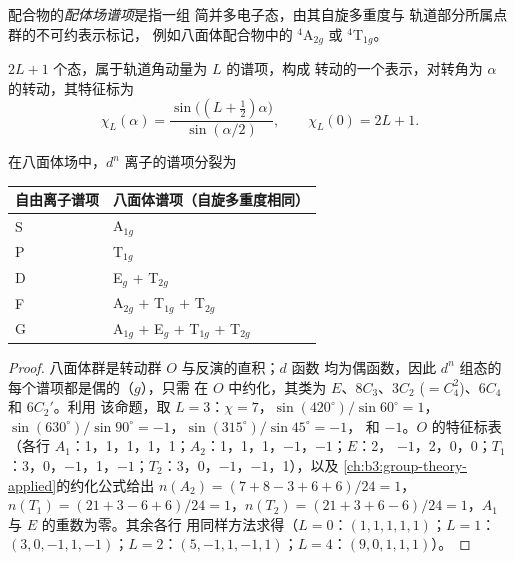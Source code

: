 \begin{definition}[配体场谱项]\label{def:b3:complex-spectra-magnetism:ligand-field-term}
配合物的\emph{配体场谱项}是指一组
简并多电子态，由其自旋多重度与
轨道部分所属点群的不可约表示标记，
例如八面体配合物中的 $^4$A$_{2g}$ 或 $^4$T$_{1g}$。
\end{definition}

\begin{proposition}[转动群的特征标]\label{prop:b3:complex-spectra-magnetism:rotation-characters}
$2L+1$ 个态，属于轨道角动量为 $L$ 的谱项，构成
转动的一个表示，对转角为 $\alpha$ 的转动，其特征标为
\[
  \chi_L(\alpha) = \frac{\sin\bigl((L + \tfrac12)\alpha\bigr)}{\sin(\alpha/2)}, \qquad \chi_L(0) = 2L + 1 .
\]
\end{proposition}

\admitted

\begin{theorem}[自由离子谱项在八面体场中的分裂]\label{thm:b3:complex-spectra-magnetism:term-splitting}
在八面体场中，$d^n$ 离子的谱项分裂为
\begin{center}
\begin{tabular}{ll}
\hline
自由离子谱项 & 八面体谱项（自旋多重度相同）\\ \hline
S & A$_{1g}$ \\
P & T$_{1g}$ \\
D & E$_g$ + T$_{2g}$ \\
F & A$_{2g}$ + T$_{1g}$ + T$_{2g}$ \\
G & A$_{1g}$ + E$_g$ + T$_{1g}$ + T$_{2g}$ \\ \hline
\end{tabular}
\end{center}
\end{theorem}

\begin{proof}
八面体群是转动群 $O$ 与反演的直积；$d$ 函数
均为偶函数，因此 $d^n$ 组态的每个谱项都是偶的（$g$），只需
在 $O$ 中约化，其类为 $E$、$8C_3$、$3C_2$ ($=C_4^2$)、$6C_4$ 和 $6C_2'$。利用
该命题，取 $L = 3$：$\chi = 7$，$\sin(420^\circ)/\sin60^\circ = 1$，$\sin(630^\circ)/\sin90^\circ = -1$，$\sin(315^\circ)/\sin45^\circ = -1$，
和 $-1$。$O$ 的特征标表（各行 $A_1$：1，1，1，1，1；$A_2$：1，1，1，$-1$，$-1$；$E$：2，
$-1$，2，0，0；$T_1$：3，0，$-1$，1，$-1$；$T_2$：3，0，$-1$，$-1$，1），以及
\cref{ch:b3:group-theory-applied}的约化公式给出 $n(A_2) = (7 + 8 - 3 + 6 + 6)/24 = 1$，$n(T_1) = (21 + 3 - 6 +
6)/24 = 1$，$n(T_2) = (21 + 3 + 6 - 6)/24 = 1$，$A_1$ 与 $E$ 的重数为零。其余各行
用同样方法求得（$L = 0$：$(1, 1, 1, 1, 1)$；$L = 1$：$(3, 0, -1, 1, -1)$；$L = 2$：$(5, -1, 1,
-1, 1)$；$L = 4$：$(9, 0, 1, 1, 1)$）。
\end{proof}

